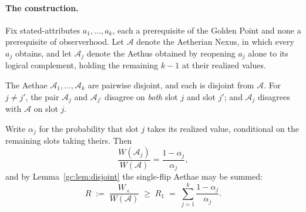 \paragraph{The construction.} Fix stated-attributes
$a_1,\dots,a_k$, each a prerequisite of the Golden Point and none a
prerequisite of observerhood. Let $\mathcal A$ denote the Aetherian
Nexus, in which every $a_j$ obtains, and let $\mathcal A_j$ denote the
Aethus obtained by reopening $a_j$ alone to its logical complement,
holding the remaining $k-1$ at their realized values.

\begin{lemma}\label{gc:lem:disjoint}
The Aethae $\mathcal A_1,\dots,\mathcal A_k$ are pairwise disjoint, and
each is disjoint from $\mathcal A$. For $j\neq j'$, the pair
$\mathcal A_j$ and $\mathcal A_{j'}$ disagree on \emph{both} slot $j$
and slot $j'$; and $\mathcal A_j$ disagrees with $\mathcal A$ on slot
$j$.
\end{lemma}

\begin{proposition}\label{gc:prop:ratio}
Write $\alpha_j$ for the probability that slot $j$ takes its realized
value, conditional on the remaining slots taking theirs. Then
\begin{equation}\label{gc:eq:ratio}
\frac{W(\mathcal A_j)}{W(\mathcal A)}=\frac{1-\alpha_j}{\alpha_j},
\end{equation}
and by Lemma~\ref{gc:lem:disjoint} the single-flip Aethae may be summed:
\begin{equation}\label{gc:eq:bound}
R \;:=\; \frac{W_\times}{W(\mathcal A)}
\;\ge\; R_1 \;=\; \sum_{j=1}^{k}\frac{1-\alpha_j}{\alpha_j}.
\end{equation}
\end{proposition}

